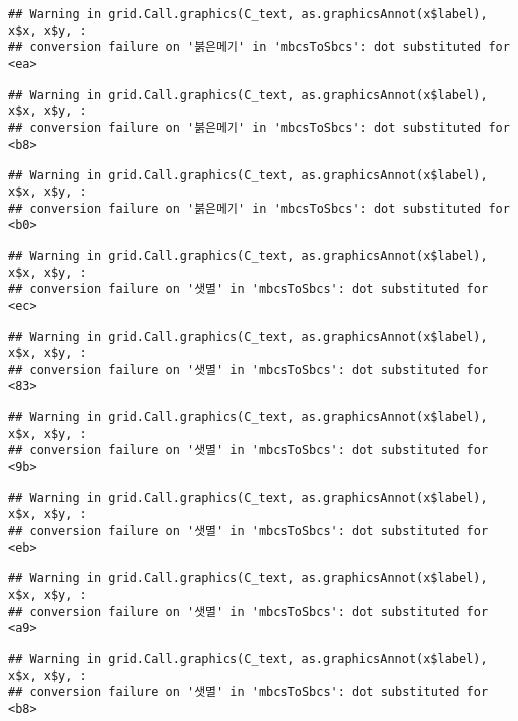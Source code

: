 \documentclass[
]{article}
\begin{document}
\begin{verbatim}
## Warning in grid.Call.graphics(C_text, as.graphicsAnnot(x$label), x$x, x$y, :
## conversion failure on '붉은메기' in 'mbcsToSbcs': dot substituted for <ea>
\end{verbatim}

\begin{verbatim}
## Warning in grid.Call.graphics(C_text, as.graphicsAnnot(x$label), x$x, x$y, :
## conversion failure on '붉은메기' in 'mbcsToSbcs': dot substituted for <b8>
\end{verbatim}

\begin{verbatim}
## Warning in grid.Call.graphics(C_text, as.graphicsAnnot(x$label), x$x, x$y, :
## conversion failure on '붉은메기' in 'mbcsToSbcs': dot substituted for <b0>
\end{verbatim}

\begin{verbatim}
## Warning in grid.Call.graphics(C_text, as.graphicsAnnot(x$label), x$x, x$y, :
## conversion failure on '샛멸' in 'mbcsToSbcs': dot substituted for <ec>
\end{verbatim}

\begin{verbatim}
## Warning in grid.Call.graphics(C_text, as.graphicsAnnot(x$label), x$x, x$y, :
## conversion failure on '샛멸' in 'mbcsToSbcs': dot substituted for <83>
\end{verbatim}

\begin{verbatim}
## Warning in grid.Call.graphics(C_text, as.graphicsAnnot(x$label), x$x, x$y, :
## conversion failure on '샛멸' in 'mbcsToSbcs': dot substituted for <9b>
\end{verbatim}

\begin{verbatim}
## Warning in grid.Call.graphics(C_text, as.graphicsAnnot(x$label), x$x, x$y, :
## conversion failure on '샛멸' in 'mbcsToSbcs': dot substituted for <eb>
\end{verbatim}

\begin{verbatim}
## Warning in grid.Call.graphics(C_text, as.graphicsAnnot(x$label), x$x, x$y, :
## conversion failure on '샛멸' in 'mbcsToSbcs': dot substituted for <a9>
\end{verbatim}

\begin{verbatim}
## Warning in grid.Call.graphics(C_text, as.graphicsAnnot(x$label), x$x, x$y, :
## conversion failure on '샛멸' in 'mbcsToSbcs': dot substituted for <b8>
\end{verbatim}
\end{document}
